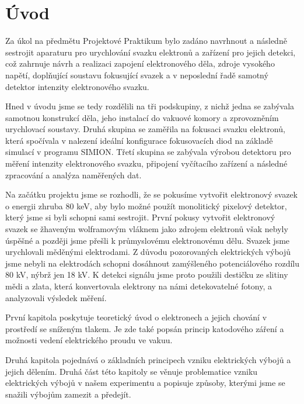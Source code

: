 \newpage
\chapter*{Úvod} %

Za úkol na předmětu Projektové Praktikum bylo zadáno navrhnout a následně sestrojit aparaturu pro urychlování svazku elektronů a zařízení pro jejich detekci, což zahrnuje návrh a realizaci zapojení elektronového děla, zdroje vysokého napětí, doplňující soustavu fokusující svazek a v neposlední řadě samotný detektor intenzity elektronového svazku. 

Hned v úvodu jsme se tedy rozdělili na tři podskupiny, z nichž jedna se zabývala samotnou konstrukcí děla, jeho instalací do vakuové komory a zprovozněním urychlovací soustavy. Druhá skupina se zaměřila na fokusaci svazku elektronů, která spočívala v nalezení ideální konfigurace fokusovacích diod na základě simulací v programu SIMION. Třetí skupina se zabývala výrobou detektoru pro měření intenzity elektronového svazku, připojení vyčítacího zařízení a následné zpracování a analýza naměřených dat.

Na začátku projektu jsme se rozhodli, že se pokusíme vytvořit elektronový svazek o energii zhruba 80 keV, aby bylo možné použít monolitický pixelový detektor, který jsme si byli schopni sami sestrojit. První pokusy vytvořit elektronový svazek se žhaveným wolframovým vláknem jako zdrojem elektronů však nebyly úspěšné a později jsme přešli k průmyslovému elektronovému dělu. Svazek jsme urychlovali měděnými elektrodami. Z důvodu pozorovaných elektrických výbojů jsme nebyli na elektrodách schopni dosáhnout zamýšleného potenciálového rozdílu 80 kV, nýbrž jen 18 kV. K detekci signálu jsme proto použili destičku ze slitiny mědi a zlata, která konvertovala elektrony na námi detekovatelné fotony, a analyzovali výsledek měření.

První kapitola poskytuje teoretický úvod o elektronech a jejich chování v prostředí se sníženým tlakem. Je zde také popsán princip katodového záření a možnosti vedení elektrického proudu ve vakuu. 

Druhá kapitola pojednává o základních principech vzniku elektrických výbojů a jejich dělením. Druhá část této kapitoly se věnuje problematice vzniku elektrických výbojů v našem experimentu a popisuje způsoby, kterými jsme se snažili výbojům zamezit a předejít.

